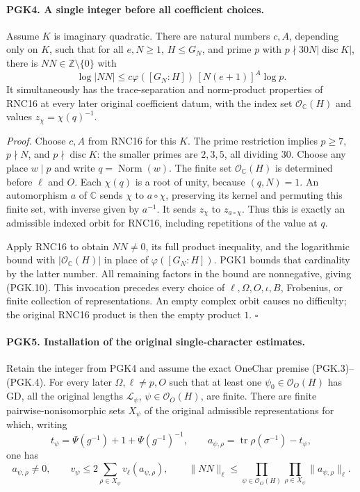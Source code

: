 \paragraph{PGK4. A single integer before all coefficient choices.}
\label{claim:PGK4}
Assume \(K\) is imaginary quadratic. There are natural numbers
\(c,A\), depending only on \(K\), such that for all
\(e,N\ge1\), \(H\le G_N\), and prime \(p\) with
\(p\nmid30N|\operatorname{disc}K|\), there is
\(NN\in\mathbb Z\setminus\{0\}\) with
\[
 \log|NN|\le
       c\varphi([G_N:H])\,[N(e+1)]^A\log p.                    \tag{PGK.10}
\]
It simultaneously has the trace-separation and norm-product
properties of RNC16 at every later original coefficient datum,
with the index set \(\mathcal O_{\mathbb C}(H)\) and values
\(z_\chi=\chi(q)^{-1}\).

\emph{Proof.}
Choose \(c,A\) from RNC16 for this \(K\). The prime restriction
implies \(p\ge7\), \(p\nmid N\), and
\(p\nmid\operatorname{disc}K\): the smaller primes are
\(2,3,5\), all dividing \(30\). Choose any place \(w\mid p\)
and write \(q=\operatorname{Norm}(w)\).
The finite set \(\mathcal O_{\mathbb C}(H)\) is determined
before \(\ell\) and \(O\). Each \(\chi(q)\) is a root of
unity, because \((q,N)=1\). An automorphism \(a\) of
\(\mathbb C\) sends \(\chi\) to \(a\circ\chi\), preserving
its kernel and permuting this finite set, with inverse given
by \(a^{-1}\). It sends \(z_\chi\) to \(z_{a\circ\chi}\).
Thus this is exactly an admissible indexed orbit for RNC16,
including repetitions of the value at \(q\).

Apply RNC16 to obtain \(NN\ne0\), its full product inequality,
and the logarithmic bound with
\(|\mathcal O_{\mathbb C}(H)|\) in place of \(\varphi([G_N:H])\).
PGK1 bounds that cardinality by the latter number. All remaining
factors in the bound are nonnegative, giving (PGK.10).
This invocation precedes every choice of \(\ell,\Omega,O,\iota,B\),
Frobenius, or finite collection of representations. An empty
complex orbit causes no difficulty; the original RNC16 product
is then the empty product \(1\). \hfill\(\square\)

\paragraph{PGK5. Installation of the original single-character estimates.}
\label{claim:PGK5}
Retain the integer from PGK4 and assume the exact
\(\mathrm{OneChar}\) premise (PGK.3)--(PGK.4). For every later
\(\Omega,\ell\ne p,O\) such that at least one
\(\psi_0\in\mathcal O_O(H)\) has \(\mathrm{GD}\), all the
original lengths \(\mathcal L_\psi\),
\(\psi\in\mathcal O_O(H)\), are finite. There are finite
pairwise-nonisomorphic sets \(X_\psi\) of the original admissible
representations for which, writing
\[
 t_\psi=\Psi(g^{-1})+1+\Psi(g^{-1})^{-1},\qquad
 a_{\psi,\rho}=\operatorname{tr}\rho(\sigma^{-1})-t_\psi,
 \tag{PGK.11}
\]
one has
\[
 a_{\psi,\rho}\ne0,\qquad
 v_\psi\le2\sum_{\rho\in X_\psi}v_\ell(a_{\psi,\rho}),\qquad
 \lVert NN\rVert_\ell\le
       \prod_{\psi\in\mathcal O_O(H)}\prod_{\rho\in X_\psi}
                         \lVert a_{\psi,\rho}\rVert_\ell .      \tag{PGK.12}
\]


